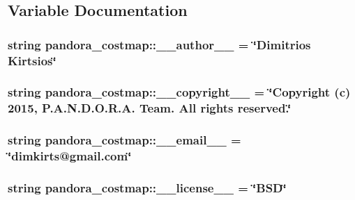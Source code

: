 \subsection{\-Variable \-Documentation}
\hypertarget{namespacepandora__costmap_a1252595e725e90b7d0652bef71741d77}{
\subsubsection[{\-\_\-\-\_\-author\-\_\-\-\_\-}]{\setlength{\rightskip}{0pt plus 5cm}string {\bf pandora\-\_\-costmap\-::\-\_\-\-\_\-author\-\_\-\-\_\-} = \char`\"{}\-Dimitrios \-Kirtsios\char`\"{}}}\label{namespacepandora__costmap_a1252595e725e90b7d0652bef71741d77}
\hypertarget{namespacepandora__costmap_a59a88d812a6b60bed327762f581ccf8f}{
\subsubsection[{\-\_\-\-\_\-copyright\-\_\-\-\_\-}]{\setlength{\rightskip}{0pt plus 5cm}string {\bf pandora\-\_\-costmap\-::\-\_\-\-\_\-copyright\-\_\-\-\_\-} = \char`\"{}\-Copyright (c) 2015, \-P.\-A.\-N.\-D.\-O.\-R.\-A. \-Team. \-All rights reserved.\char`\"{}}}\label{namespacepandora__costmap_a59a88d812a6b60bed327762f581ccf8f}
\hypertarget{namespacepandora__costmap_af0e6ea2ce71fdf21e890483cca0416f4}{
\subsubsection[{\-\_\-\-\_\-email\-\_\-\-\_\-}]{\setlength{\rightskip}{0pt plus 5cm}string {\bf pandora\-\_\-costmap\-::\-\_\-\-\_\-email\-\_\-\-\_\-} = \char`\"{}dimkirts@gmail.\-com\char`\"{}}}\label{namespacepandora__costmap_af0e6ea2ce71fdf21e890483cca0416f4}
\hypertarget{namespacepandora__costmap_a8031a61b9e8498f517bdb780eb231f48}{
\subsubsection[{\-\_\-\-\_\-license\-\_\-\-\_\-}]{\setlength{\rightskip}{0pt plus 5cm}string {\bf pandora\-\_\-costmap\-::\-\_\-\-\_\-license\-\_\-\-\_\-} = \char`\"{}\-B\-S\-D\char`\"{}}}\label{namespacepandora__costmap_a8031a61b9e8498f517bdb780eb231f48}
